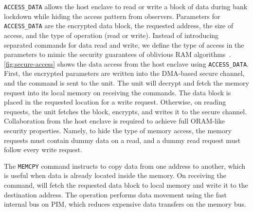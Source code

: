  \texttt{ACCESS\_DATA} allows the host enclave to read or write a block of data during bank lockdown while hiding the access pattern from observers. Parameters for \texttt{ACCESS\_DATA} are the encrypted data block, the requested address, the size of access, and the type of operation (read or write). Instead of introducing separated commands for data read and write, we define the type of access in the parameters to mimic the security guarantees of oblivious RAM algorithms~\cite{path-oram}. \autoref{fig:secure-access} shows the data access from the host enclave using \texttt{ACCESS\_DATA}. First, the encrypted parameters are written into the DMA-based secure channel, and the command is sent to the \thename unit. The \thename unit will decrypt and fetch the memory request into its local memory on receiving the commands. The data block is placed in the requested location for a write request. Otherwise, on reading requests, the \thename unit fetches the block, encrypts, and writes it to the secure channel. Collaboration from the host enclave is required to achieve full ORAM-like security properties. Namely, to hide the type of memory access, the memory requests must contain dummy data on a read, and a dummy read request must follow every write request.

 The \texttt{MEMCPY} command instructs \thename to copy data from one address to another, which is useful when data is already located inside the memory. On receiving the command, \thename will fetch the requested data block to local memory and write it to the destination address. The operation performs data movement using the fast internal bus on PIM, which reduces expensive data transfers on the memory bus.





